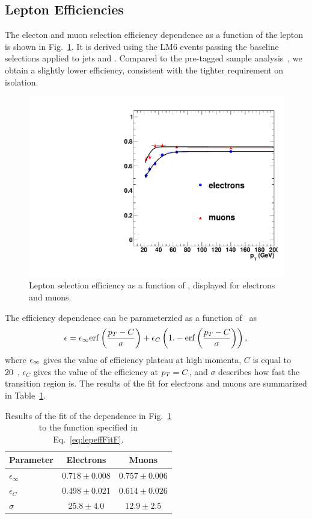 \subsection{Lepton Efficiencies}
\label{sec:lepeff}
%
The electon and muon selection efficiency dependence as a function of the lepton \pt
is shown in Fig.~\ref{fig:lepeffLM6}.
It is derived using the LM6 events passing the baseline selections applied to jets and \met.
Compared to the pre-tagged sample analysis~\cite{ssnote2011}, we obtain a slightly
lower efficiency, consistent with the tighter requirement on isolation.

\begin{figure}[h]
\begin{center}
\includegraphics[width=0.7\linewidth]{figs/leptonEfficiency_lm6}
\caption{\label{fig:lepeffLM6}
Lepton selection efficiency as a function of \pt,
displayed for electrons and muons.
}
\end{center}
\end{figure}

%
The efficiency dependence can be parameterzied as a function of \pt\ as 
%
\begin{eqnarray}
\epsilon = \epsilon_{\rm \infty} {\rm erf}\left ( \frac{p_T - C}{\sigma} \right)
	+ \epsilon_C \left( 1.- {\rm erf}\left ( \frac{p_T - C}{\sigma} \right) \right),
\label{eq:lepeffFitF}
\end{eqnarray}
where $\epsilon_{\rm \infty}$ gives the value of efficiency plateau at high momenta,
$C$ is equal to 20~\GeV,
$\epsilon_C$ gives the value of the efficiency at $p_T=C$,
and $\sigma$ describes how fast the transition region is.
The results of the fit for electrons and muons are summarized in Table~\ref{tab:lepeffLM6fit}.
%
\begin{table}[h]
\begin{center}
\caption{\label{tab:lepeffLM6fit} Results of the fit of the dependence in Fig.~\ref{fig:lepeffLM6}
to the function specified in Eq.~\ref{eq:lepeffFitF}.}
\begin{tabular}{l|cc}\hline\hline
Parameter		& Electrons		& Muons			\\ \hline
$\epsilon_{\infty}$	& $0.718\pm0.008$	& $0.757\pm0.006$	\\
$\epsilon_{C}$		& $0.498\pm0.021$	& $0.614\pm0.026$	\\
$\sigma$		& $25.8\pm4.0$		& $12.9\pm2.5$		\\
\hline\hline
\end{tabular}
\end{center}
\end{table}

